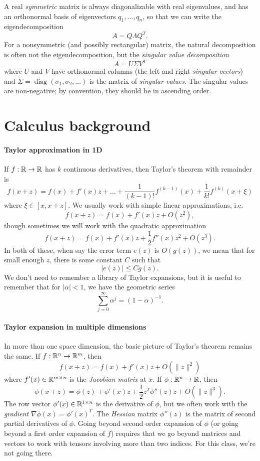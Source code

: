 \documentclass[12pt, leqno]{article}
\begin{document}
A real {\em symmetric} matrix is always diagonalizable with real
eigenvalues, and has an orthonormal basis of eigenvectors $q_1,
\ldots, q_n$, so that we can write the eigendecomposition
\[
  A = Q \Lambda Q^T.
\]
For a nonsymmetric (and possibly rectangular) matrix, the natural
decomposition is often not the eigendecomposition, but
the {\em singular value decomposition}
\[
  A = U \Sigma V^T
\]
where $U$ and $V$ have orthonormal columns (the left and right {\em
  singular vectors}) and $\Sigma = \operatorname{diag}(\sigma_1,
\sigma_2, \ldots)$ is the matrix of {\em singular values}.
The singular values are non-negative; by convention, they should
be in ascending order.

\section{Calculus background}

\paragraph{Taylor approximation in 1D}
If $f : \mathbb{R} \rightarrow \mathbb{R}$ has $k$ continuous derivatives, then
Taylor's theorem with remainder is
\[
  f(x+z) = f(x) + f'(x) z + \ldots + \frac{1}{(k-1)!} f^{(k-1)}(x) +
           \frac{1}{k!} f^{(k)}(x+\xi)
\]
where $\xi \in [x, x+z]$.  We usually work with simple linear
approximations, i.e.
\[
  f(x+z) = f(x) + f'(x) z + O(z^2),
\]
though sometimes we will work with the quadratic approximation
\[
  f(x+z) = f(x) + f'(x) z + \frac{1}{2} f''(x) z^2 + O(z^3).
\]
In both of these, when say the error term $e(z)$ is $O(g(z))$, we mean
that for small enough $z$, there is some constant $C$ such that
\[
  |e(z)| \leq C g(z).
\]
We don't need to remember a library of Taylor expansions, but it is
useful to remember that for $|\alpha| < 1$, we have the geometric series
\[
  \sum_{j=0}^\infty \alpha^j = (1-\alpha)^{-1}.
\]

\paragraph{Taylor expansion in multiple dimensions}
In more than one space dimension, the basic picture of Taylor's
theorem remains the same.  If $f : \mathbb{R}^n \rightarrow \mathbb{R}^m$, then
\[
  f(x+z) = f(x) + f'(x) z + O(\|z\|^2)
\]
where $f'(x) \in \mathbb{R}^{m \times n}$ is the {\em Jacobian matrix}
at $x$.  If $\phi : \mathbb{R}^n \rightarrow \mathbb{R}$, then
\[
  \phi(x+z) = \phi(z) + \phi'(x) z + \frac{1}{2} z^T \phi''(z) z + O(\|z\|^3).
\]
The row vector $\phi'(x) \in \mathbb{R}^{1 \times n}$ is the derivative of
$\phi$, but we often work with the {\em gradient} $\nabla \phi(x) =
\phi'(x)^T$.  The {\em Hessian} matrix $\phi''(z)$ is the matrix of
second partial derivatives of $\phi$.  Going beyond second order
expansion of $\phi$ (or going beyond a first order expansion of $f$)
requires that we go beyond matrices and vectors to
work with tensors involving more than two indices.  For this class,
we're not going there.
\end{document}
